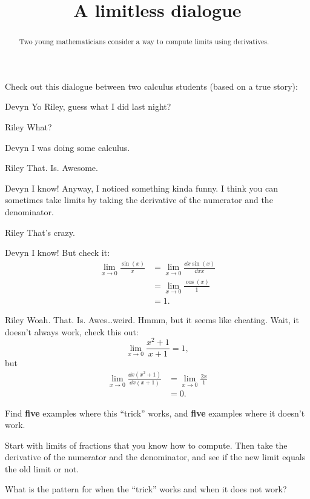 \documentclass{ximera}
\title[Break-Ground:]{A limitless dialogue}
\begin{document}
\begin{abstract}
Two young mathematicians consider a way to compute limits using derivatives.
\end{abstract}
\maketitle

Check out this dialogue between two calculus students (based on a true
story):

\begin{dialogue}
\item[Devyn] Yo Riley, guess what I did last night?
\item[Riley] What?
\item[Devyn] I was doing some calculus.
\item[Riley] That. Is. Awesome.
\item[Devyn] I know! Anyway, I noticed something kinda funny. I
  think you can sometimes take limits by taking the derivative of the
  numerator and the denominator.
\item[Riley] That's crazy.
\item[Devyn] I know! But check it:
  \begin{align*}
    \lim_{x\to 0} \frac{\sin(x)}{x} &= \lim_{x\to 0} \frac{\dd{x}\sin(x)}{\dd{x}x}\\
    &= \lim_{x\to 0} \frac{\cos(x)}{1}\\
    &=1.
  \end{align*}
  \item[Riley] Woah. That. Is. Awes\dots weird. Hmmm, but it seems like
    cheating. Wait, it doesn't always work, check this out:
    \[
    \lim_{x\to 0} \frac{x^2+1}{x+1} = 1,
    \]
    but
    \begin{align*}
      \lim_{x\to 0} \frac{\dd{x}\left(x^2+1\right)}{\dd{x}\left(x+1\right)} &=
      \lim_{x\to 0} \frac{2x}{1} \\
      &=0.
    \end{align*}
\end{dialogue}

\begin{problem}
  Find \textbf{five} examples where this ``trick'' works, and
  \textbf{five} examples where it doesn't work.
  \begin{hint}
    Start with limits of fractions that you know how to compute. Then
    take the derivative of the numerator and the denominator, and see
    if the new limit equals the old limit or not.
  \end{hint}
  \begin{freeResponse}
  \end{freeResponse}
\end{problem}

\begin{problem}
  What is the pattern for when the ``trick'' works and when it does not work?
  \begin{freeResponse}
\end{freeResponse}
\end{problem}


\end{document}
